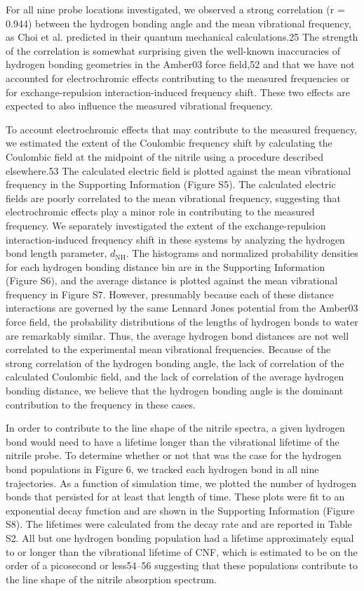 For all nine probe locations investigated, we observed a strong correlation (r = 0.944) between the hydrogen bonding angle and the mean vibrational frequency, as Choi et al. predicted in their quantum mechanical calculations.25
The strength of the correlation is somewhat surprising given the well-known inaccuracies of hydrogen bonding geometries in the Amber03 force field,52 and that we have not accounted for electrochromic effects contributing to the measured frequencies or for exchange-repulsion interaction-induced frequency shift.
These two effects are expected to also influence the measured vibrational frequency.  

To account electrochromic effects that may contribute to the measured frequency, we estimated the extent of the Coulombic frequency shift by calculating the Coulombic field at the midpoint of the nitrile using a procedure described elsewhere.53
The calculated electric field is plotted against the mean vibrational frequency in the Supporting Information (Figure S5).
The calculated electric fields are poorly correlated to the mean vibrational frequency, suggesting that electrochromic effects play a minor role in contributing to the measured frequency.
We separately investigated the extent of the exchange-repulsion interaction-induced frequency shift in these systems by analyzing the hydrogen bond length parameter, $d_{\text{NH}}$.
The histograms and normalized probability densities for each hydrogen bonding distance bin are in the Supporting Information (Figure S6), and the average distance is plotted against the mean vibrational frequency in Figure S7.
However, presumably because each of these distance interactions are governed by the same Lennard Jones potential from the Amber03 force field, the probability distributions of the lengths of hydrogen bonds to water are remarkably similar.
Thus, the average hydrogen bond distances are not well correlated to the experimental mean vibrational frequencies.
Because of the strong correlation of the hydrogen bonding angle, the lack of correlation of the calculated Coulombic field, and the lack of correlation of the average hydrogen bonding distance, we believe that the hydrogen bonding angle is the dominant contribution to the frequency in these cases.

In order to contribute to the line shape of the nitrile spectra, a given hydrogen bond would need to have a lifetime longer than the vibrational lifetime of the nitrile probe.
To determine whether or not that was the case for the hydrogen bond populations in Figure 6, we tracked each hydrogen bond in all nine trajectories.
As a function of simulation time, we plotted the number of hydrogen bonds that persisted for at least that length of time.
These plots were fit to an exponential decay function and are shown in the Supporting Information (Figure S8).
The lifetimes were calculated from the decay rate and are reported in Table S2.
All but one hydrogen bonding population had a lifetime approximately equal to or longer than the vibrational lifetime of CNF, which is estimated to be on the order of a picosecond or less54–56 suggesting that these populations contribute to the line shape of the nitrile absorption spectrum.

